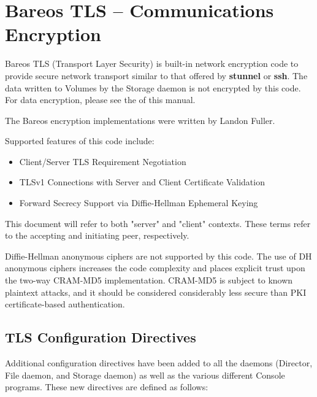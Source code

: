 
\chapter{Bareos TLS -- Communications Encryption}
\label{CommEncryption}

Bareos TLS (Transport Layer Security) is built-in network
encryption code to provide secure network transport similar to
that offered by {\bf stunnel} or {\bf ssh}.  The data written to
Volumes by the Storage daemon is not encrypted by this code.
For data encryption, please see the  of this manual.

The Bareos encryption implementations were written by Landon Fuller.

Supported features of this code include:
\begin{itemize}
\item Client/Server TLS Requirement Negotiation
\item TLSv1 Connections with Server and Client Certificate
Validation
\item Forward Secrecy Support via Diffie-Hellman Ephemeral Keying
\end{itemize}

This document will refer to both "server" and "client" contexts.  These
terms refer to the accepting and initiating peer, respectively.

Diffie-Hellman anonymous ciphers are not supported by this code.  The
use of DH anonymous ciphers increases the code complexity and places
explicit trust upon the two-way CRAM-MD5 implementation.  CRAM-MD5 is
subject to known plaintext attacks, and it should be considered
considerably less secure than PKI certificate-based authentication.

\section{TLS Configuration Directives}
Additional configuration directives have been added to all the daemons
(Director, File daemon, and Storage daemon) as well as the various
different Console programs.
These new directives are defined as follows:

